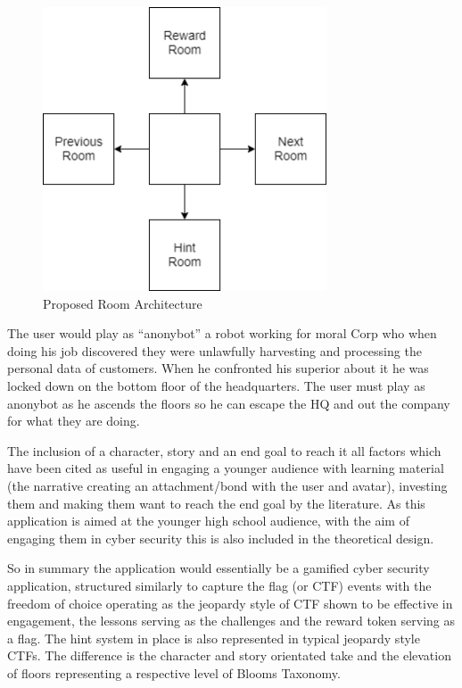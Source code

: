 \documentclass[12pt,a4paper]{article}
\begin{document}
\begin{figure}[h]
    \centering
    \includegraphics[width=0.75\textwidth]{Figs/roomarch.png} 
    \caption{Proposed Room Architecture} 
    \label{roomarch}
\end{figure}

The user would play as “anonybot” a robot working for moral Corp who when doing his job discovered they were unlawfully harvesting and processing the personal data of customers. When he confronted his superior about it he was locked down on the bottom floor of the headquarters. The user must play as anonybot as he ascends the floors so he can escape the HQ and out the company for what they are doing.

The inclusion of a character, story and an end goal to reach it all factors which have been cited as useful in engaging a younger audience with learning material \cite{adams2015cybersecurity1} (the narrative creating an attachment/bond with the user and avatar), investing them and making them want to reach the end goal by the literature. As this application is aimed at the younger high school audience, with the aim of engaging them in cyber security this is also included in the theoretical design. 

So in summary the application would essentially be a gamified cyber security application, structured similarly to capture the flag (or CTF) events with the freedom of choice operating as the jeopardy style of CTF shown to be effective in engagement, the lessons serving as the challenges and the reward token serving as a flag. The hint system in place is also represented in typical jeopardy style CTFs. The difference is the character and story orientated take and the elevation of floors representing a respective level of Blooms Taxonomy. 
\end{document}

